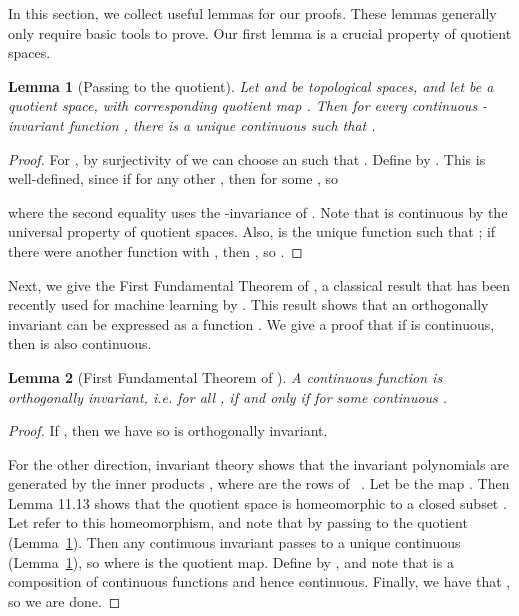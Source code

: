 \documentclass{article} \usepackage{iclr2023_conference,times}
\newtheorem{lemma}{Lemma}
\begin{document}
In this section, we collect useful lemmas for our proofs. These lemmas generally only require basic tools to prove.  Our first lemma is a crucial property of quotient spaces.

\begin{lemma}[Passing to the quotient]\label{lem:pass_to_quotient}
    Let  and  be topological spaces, and let  be a quotient space, with corresponding quotient map . Then for every continuous -invariant function , there is a unique continuous  such that
    .
\end{lemma}
\begin{proof}
    For , by surjectivity of  we can choose an  such that . Define  by . This is well-defined, since if  for any other , then  for some , so 
    
    where the second equality uses the -invariance of . Note that  is continuous by the universal property of quotient spaces. Also,  is the  unique function such that ; if there were another function  with , then , so .
\end{proof}

Next, we give the First Fundamental Theorem of , a classical result that has been recently used for machine learning by \cite{villar2021scalars}. This result shows that an orthogonally invariant  can be expressed as a function . We give a proof that if  is continuous, then  is also continuous.
\begin{lemma}[First Fundamental Theorem of ]\label{lem:first_fund}
    A continuous function  is orthogonally invariant, i.e.  for all , if and only if  for some continuous .
\end{lemma}
\begin{proof}
    If , then we have  so  is orthogonally invariant.

    For the other direction, invariant theory shows that the  invariant polynomials are generated by the inner products , where  are the rows of ~\citep{kraft1996classical}. Let  be the map . Then \cite{gonzalez2003c} Lemma 11.13 shows that the quotient space  is homeomorphic to a closed subset . Let  refer to this homeomorphism, and note that  by passing to the quotient (Lemma~\ref{lem:pass_to_quotient}). Then any continuous  invariant  passes to a unique continuous  (Lemma~\ref{lem:pass_to_quotient}), so  where  is the quotient map. Define  by , and note that  is a composition of continuous functions and hence continuous. Finally, we have that , so we are done.
\end{proof}
\end{document}
